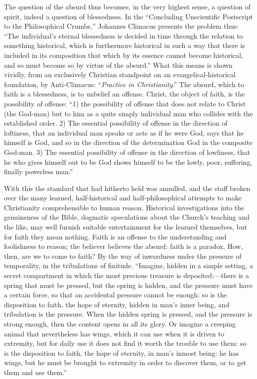 \documentclass[12pt,a4paper,openany]{book}
\newcommand{\opage}[1]{\marginnote{\footnotesize\textit{[#1]}}}
\begin{document}
The question of the absurd thus becomes, in the very highest sense, a
question of spirit, indeed a question of blessedness. In the
``Concluding Unscientific Postscript to the Philosophical Crumbs,''
Johannes Climacus presents the problem thus: ``The individual's eternal
blessedness is decided in time through the relation to something
historical, which is furthermore historical in such a way that there is
included in its composition that which by its essence cannot become
historical, and so must become so by virtue of the absurd.'' What this
means is shown vividly, from an exclusively Christian standpoint on an
evangelical-historical foundation, by Anti-Climacus: ``\emph{Practice in
Christianity}.'' The absurd, which to faith is a blessedness, is to
unbelief an offense. Christ, the object of faith, is the possibility of
offense: ``1) the possibility of offense that does not relate to Christ
(the God-man) but to him as a quite simply individual man who collides
with the established order. 2) The essential possibility of offense in
the direction of loftiness, that an individual man speaks or acts as if
he were God, says that he himself is God, and so in the direction of the
determination God in the composite God-man. 3) The essential possibility
of offense in the direction of lowliness, that he who gives himself out
to be God shows himself to be the lowly, poor, suffering, finally
powerless man.''

With this the standard that had hitherto held was annulled, and the
staff broken over the many learned, half-historical and half-philosophical
attempts to make Christianity comprehensible to human reason. \opage{61}Historical
investigations into the genuineness of the Bible, dogmatic speculations
about the Church's teaching and the like, may well furnish suitable
entertainment for the learned themselves, but for faith they mean
nothing. Faith is an offense to the understanding and foolishness to
reason; the believer believes the absurd: faith is a
paradox. How, then, are we to come to faith? By the way of inwardness
under the pressure of temporality, in the tribulations of finitude.
``Imagine, hidden in a simple setting, a secret compartment in which the
most precious treasure is deposited;---there is a spring that must be
pressed, but the spring is hidden, and the pressure must have a certain
force, so that an accidental pressure cannot be enough: so is the
disposition to faith, the hope of eternity, hidden in man's inner being,
and tribulation is the pressure. When the hidden spring is pressed, and
the pressure is strong enough, then the content opens in all its glory.
Or imagine a creeping animal that nevertheless has wings, which it can
use when it is driven to extremity, but for daily use it does not find it
worth the trouble to use them: so is the disposition to faith, the hope
of eternity, in man's inmost being: he has wings, but he must be brought
to extremity in order to discover them, or to get them and use them.''
\end{document}
